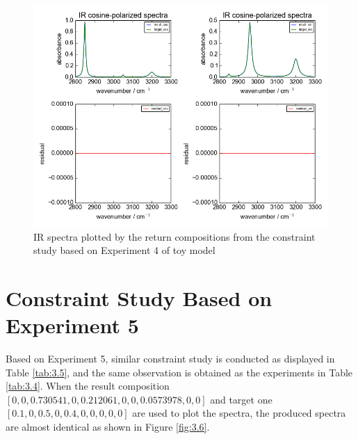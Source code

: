 \begin{figure}[!ht] 
\centering
\includegraphics[scale=0.7]{Figures/toy_model_result_plotting_ir_sin_4candi_constraint_study_experiment4.png} 
\caption{IR spectra plotted by the return compositions from the constraint study based on Experiment 4 of toy model}\label{fig:3.5}
\end{figure}


\section{Constraint Study Based on Experiment 5}

Based on Experiment 5, similar constraint study is conducted as displayed in Table \ref{tab:3.5}, and the same observation is obtained as the experiments in Table \ref{tab:3.4}. When the result composition $[0, 0, 0.730541, 0, 0.212061,0, 0, 0.0573978, 0, 0]$ and target one $[0.1, 0, 0.5, 0, 0.4, 0, 0, 0, 0, 0]$ are used to plot the spectra, the produced spectra are almost identical as shown in Figure \ref{fig:3.6}.

